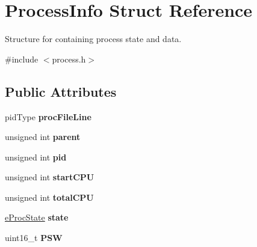 \hypertarget{structProcessInfo}{\section{\-Process\-Info \-Struct \-Reference}
\label{dd/dc8/structProcessInfo}
}


\-Structure for containing process state and data.  




{\ttfamily \#include $<$process.\-h$>$}

\subsection*{\-Public \-Attributes}
\begin{DoxyCompactItemize}
\item 
\hypertarget{structProcessInfo_a8973fa79d29653211d04b6cf0a993c70}{pid\-Type {\bfseries proc\-File\-Line}}\label{dd/dc8/structProcessInfo_a8973fa79d29653211d04b6cf0a993c70}

\item 
\hypertarget{structProcessInfo_a102b9e7e7d958b508cec182bbcaf7d85}{unsigned int {\bfseries parent}}\label{dd/dc8/structProcessInfo_a102b9e7e7d958b508cec182bbcaf7d85}

\item 
\hypertarget{structProcessInfo_ab522cec1e6f7f3b6a7780e6b4611c1f4}{unsigned int {\bfseries pid}}\label{dd/dc8/structProcessInfo_ab522cec1e6f7f3b6a7780e6b4611c1f4}

\item 
\hypertarget{structProcessInfo_ac1e6244dd31274040bdf7ad7ee40db4a}{unsigned int {\bfseries start\-C\-P\-U}}\label{dd/dc8/structProcessInfo_ac1e6244dd31274040bdf7ad7ee40db4a}

\item 
\hypertarget{structProcessInfo_a8a6eda10132e07b1596c09822724b0c7}{unsigned int {\bfseries total\-C\-P\-U}}\label{dd/dc8/structProcessInfo_a8a6eda10132e07b1596c09822724b0c7}

\item 
\hypertarget{structProcessInfo_a748790bb8c3ef5d2dff552f35b81298e}{\hyperlink{process_8h_a2c72cb00af5be695c1f898162350821f}{e\-Proc\-State} {\bfseries state}}\label{dd/dc8/structProcessInfo_a748790bb8c3ef5d2dff552f35b81298e}

\item 
\hypertarget{structProcessInfo_af818acf9075de7c0100858908bcc2867}{uint16\-\_\-t {\bfseries \-P\-S\-W}}\label{dd/dc8/structProcessInfo_af818acf9075de7c0100858908bcc2867}


\end{DoxyCompactItemize}
